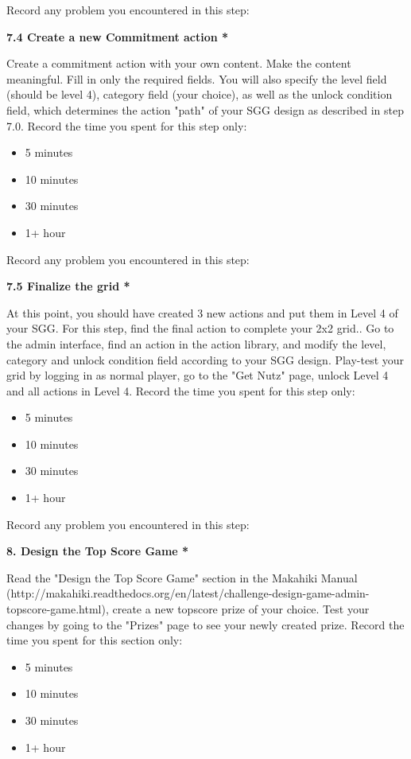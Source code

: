 Record any problem you encountered in this step:

{\bf 7.4 Create a new Commitment action *}

Create a commitment action with your own content. Make the content meaningful. Fill in only the required fields. You will also specify the level field (should be level 4), category field (your choice), as well as the unlock condition field, which determines the action "path" of your SGG design as described in step 7.0. Record the time you spent for this step only:

\begin{itemize}
\item 5 minutes
\item  10 minutes
\item  30 minutes
\item  1+ hour
\end{itemize}


Record any problem you encountered in this step:

{\bf 7.5 Finalize the grid *}

At this point, you should have created 3 new actions and put them in Level 4 of your SGG. For this step, find the final action to complete your 2x2 grid.. Go to the admin interface, find an action in the action library, and modify the level, category and unlock condition field according to your SGG design. Play-test your grid by logging in as normal player, go to the "Get Nutz" page, unlock Level 4 and all actions in Level 4. Record the time you spent for this step only:

\begin{itemize}
\item 5 minutes
\item  10 minutes
\item  30 minutes
\item  1+ hour
\end{itemize}


Record any problem you encountered in this step:

{\bf 8. Design the Top Score Game *}

Read the "Design the Top Score Game" section in the Makahiki Manual (http://makahiki.readthedocs.org/en/latest/challenge-design-game-admin-topscore-game.html), create a new topscore prize of your choice. Test your changes by going to the "Prizes" page to see your newly created prize. Record the time you spent for this section only:

\begin{itemize}
\item 5 minutes
\item  10 minutes
\item  30 minutes
\item  1+ hour
\end{itemize}



